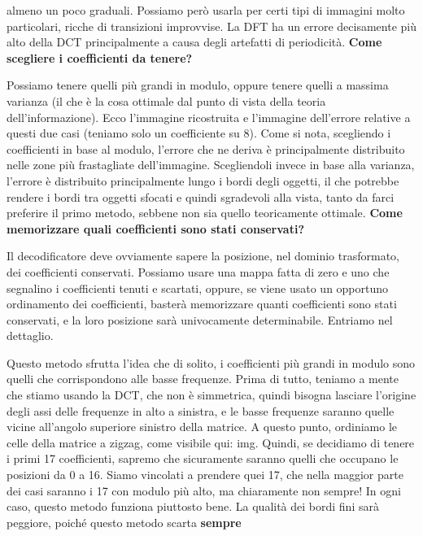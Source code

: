 \documentclass[a4paper,11pt]{article}
\begin{document}
almeno un poco graduali. Possiamo però usarla per certi tipi di immagini molto particolari, ricche di transizioni improvvise.
La DFT ha un errore decisamente più alto della DCT principalmente a causa degli artefatti di periodicità.
\newline
\newline
\textbf{Come scegliere i coefficienti da tenere?}
\par
Possiamo tenere quelli più grandi in modulo, oppure tenere quelli a massima varianza (il che è la cosa ottimale dal punto di vista della teoria dell'informazione).
Ecco l'immagine ricostruita e l'immagine dell'errore relative a questi due casi (teniamo solo un coefficiente su 8).
Come si nota, scegliendo i coefficienti in base al modulo, l'errore che ne deriva è principalmente distribuito nelle zone più frastagliate dell'immagine. Scegliendoli invece in base alla varianza, l'errore
è distribuito principalmente lungo i bordi degli oggetti, il che potrebbe rendere i bordi tra oggetti sfocati e quindi sgradevoli alla vista, tanto da farci preferire il primo metodo, sebbene non sia
quello teoricamente ottimale.
\newline
\newline
\textbf{Come memorizzare quali coefficienti sono stati conservati?}
\par
Il decodificatore deve ovviamente sapere la posizione, nel dominio trasformato, dei coefficienti conservati. Possiamo usare una mappa fatta di zero e uno che segnalino i coefficienti tenuti e scartati,
oppure, se viene usato un opportuno ordinamento dei coefficienti, basterà memorizzare quanti coefficienti sono stati conservati, e la loro posizione sarà univocamente determinabile. Entriamo nel dettaglio.
\par
Questo metodo sfrutta l'idea che di solito, i coefficienti più grandi in modulo sono quelli che corrispondono alle basse frequenze.
Prima di tutto, teniamo a mente che stiamo usando la DCT, che non è simmetrica, quindi bisogna lasciare l'origine degli assi delle frequenze in alto a sinistra, e le basse frequenze saranno quelle
vicine all'angolo superiore sinistro della matrice. A questo punto, ordiniamo le celle della matrice a zigzag, come visibile qui: img.
Quindi, se decidiamo di tenere i primi 17 coefficienti, sapremo che sicuramente saranno quelli che occupano le posizioni da 0 a 16. Siamo vincolati a prendere quei 17, che nella maggior parte dei casi
saranno i 17 con modulo più alto, ma chiaramente non sempre! In ogni caso, questo metodo funziona piuttosto bene. La qualità dei bordi fini sarà peggiore, poiché questo metodo scarta \textbf{sempre}
\end{document}
